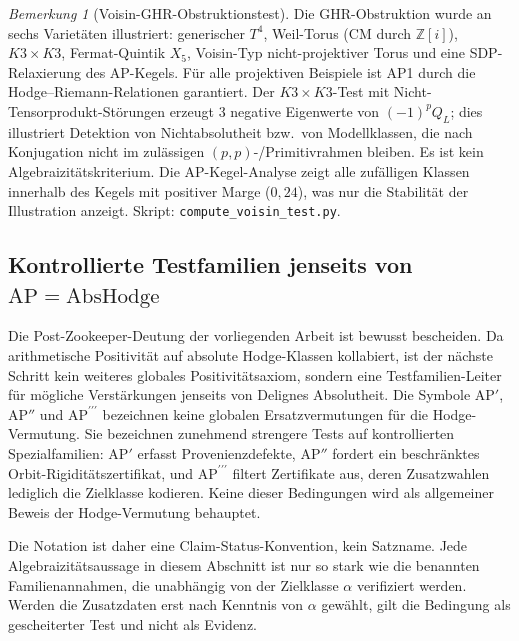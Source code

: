 \documentclass[aps,prd,twocolumn,superscriptaddress,nofootinbib]{revtex4-2}
\theoremstyle{definition}
\theoremstyle{remark}
\newtheorem{remark}[theorem]{Bemerkung}
\begin{document}
\begin{remark}[Voisin-GHR-Obstruktionstest]
\label{rem:voisin-ghr}
Die GHR-Obstruktion wurde an sechs Varietäten illustriert: generischer $T^4$, Weil-Torus (CM durch $\mathbb{Z}[i]$), $K3 \times K3$, Fermat-Quintik $X_5$, Voisin-Typ nicht-projektiver Torus und eine SDP-Relaxierung des AP-Kegels. Für alle projektiven Beispiele ist AP1 durch die Hodge--Riemann-Relationen garantiert. Der $K3 \times K3$-Test mit Nicht-Tensorprodukt-Störungen erzeugt 3 negative Eigenwerte von $(-1)^p Q_L$; dies illustriert Detektion von Nichtabsolutheit bzw.\ von Modellklassen, die nach Konjugation nicht im zulässigen $(p,p)$-/Primitivrahmen bleiben. Es ist kein Algebraizitätskriterium. Die AP-Kegel-Analyse zeigt alle zufälligen Klassen innerhalb des Kegels mit positiver Marge ($0{,}24$), was nur die Stabilität der Illustration anzeigt. Skript: \texttt{compute\_voisin\_test.py}.
\end{remark}

\subsection{Kontrollierte Testfamilien jenseits von \texorpdfstring{$\mathrm{AP}=\mathrm{AbsHodge}$}{AP=AbsHodge}}
\label{subsec:zookeeper-hodge-transfer}

Die Post-Zookeeper-Deutung der vorliegenden Arbeit ist bewusst bescheiden.  Da
arithmetische Positivität auf absolute Hodge-Klassen kollabiert, ist der
nächste Schritt kein weiteres globales Positivitätsaxiom, sondern eine
Testfamilien-Leiter für mögliche Verstärkungen jenseits von Delignes
Absolutheit.
Die Symbole $\mathrm{AP}'$, $\mathrm{AP}''$ und
$\mathrm{AP}^{\prime\prime\prime}$ bezeichnen keine globalen
Ersatzvermutungen für die Hodge-Vermutung. Sie bezeichnen zunehmend
strengere Tests auf kontrollierten Spezialfamilien: $\mathrm{AP}'$ erfasst
Provenienzdefekte, $\mathrm{AP}''$ fordert ein beschränktes
Orbit-Rigiditätszertifikat, und $\mathrm{AP}^{\prime\prime\prime}$ filtert
Zertifikate aus, deren Zusatzwahlen lediglich die Zielklasse kodieren. Keine
dieser Bedingungen wird als allgemeiner Beweis der Hodge-Vermutung behauptet.

Die Notation ist daher eine Claim-Status-Konvention, kein Satzname. Jede
Algebraizitätsaussage in diesem Abschnitt ist nur so stark wie die benannten
Familienannahmen, die unabhängig von der Zielklasse $\alpha$ verifiziert
werden. Werden die Zusatzdaten erst nach Kenntnis von $\alpha$ gewählt, gilt
die Bedingung als gescheiterter Test und nicht als Evidenz.
\end{document}

